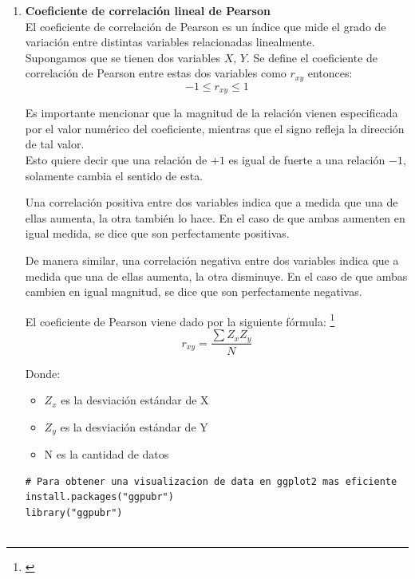\begin{enumerate}
    \item \textbf{Coeficiente de correlación lineal de Pearson} \\
    El coeficiente de correlación de Pearson es un índice que mide el grado de variación entre distintas variables relacionadas linealmente. \\
    
    Supongamos que se tienen dos variables $X$, $Y$.
    Se define el coeficiente de correlación de Pearson entre estas dos variables como $r_{xy}$ entonces:
    \begin{equation*}
        -1 \leq r_{xy} \leq 1
    \end{equation*}

    Es importante mencionar que la magnitud de la relación vienen especificada por el valor numérico del coeficiente, mientras que el signo refleja la dirección de tal valor. \\

    Esto quiere decir que una relación de $+1$ es igual de fuerte a una relación $-1$, solamente cambia el sentido de esta.

   Una correlación positiva entre dos variables indica que a medida que una de ellas aumenta, la otra también lo hace. En el caso de que ambas aumenten en igual medida, se dice que son perfectamente positivas.

   De manera similar, una correlación negativa entre dos variables indica que a medida que una de ellas aumenta, la otra disminuye. En el caso de que ambas cambien en igual magnitud, se dice que son perfectamente negativas.

   El coeficiente de Pearson viene dado por la siguiente fórmula: \footnote{\cite{coef_pearsen}}
   \begin{equation}
       r_{xy} = \frac{\sum Z_x Z_y}{N} 
   \end{equation}
   
   Donde: 
   
   \begin{itemize}
       \item $Z_x$ es la desviación estándar de X
       \item $Z_y$ es la desviación estándar de Y
       \item N es la cantidad de datos 
   \end{itemize}

\newpage

\begin{lstlisting}[caption={Coeficiente de correlacion lineal de Pearson}, label=lst:rchunk1]
# Para obtener una visualizacion de data en ggplot2 mas eficiente
install.packages("ggpubr")
library("ggpubr")


\end{lstlisting}
\end{enumerate}
